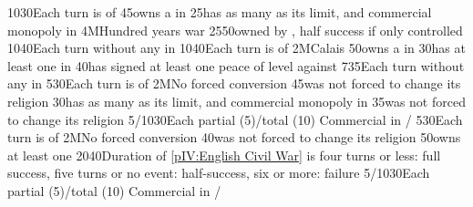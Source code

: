 

 
%
%
{10}{30}{Each turn \paysEcosse is \VASSAL of \ANG}%
%
%
{}{45}{\ANG owns a \Presidio in \provincePicardie}%
%
%
{}{25}{\ANG has as many \MNU\faceplus as its limit, and commercial monopoly in
  }%
%
\EUobjective4M{Hundred years war}{}%
{25}{50}{\provinceGuyenne owned by \paysmajeurAngleterre, half success if only
  controlled}%
%
%
{10}{40}{Each turn without any \REVOLT in \regionIrlande}%
%
%
%
{10}{40}{Each turn \paysEcosse is \VASSAL of \ANG}%
%
\EUobjective2M{Calais}{}%
{}{50}{\ANG owns a \Presidio in \provincePicardie}%
%
%
{}{30}{\ANG has at least one \COL in \continentAmerica}%
%
%
{}{40}{\ANG has signed at least one peace of level  against \FRA}%
%
%
{7}{35}{Each turn without any \REVOLT in \regionIrlande}
%
%
%
{5}{30}{Each turn \paysEcosse is \VASSAL of \ANG}%
%
\EUobjective2M{No forced conversion}{}%
{}{45}{\ANG was not forced to change its religion}%
%
%
{}{30}{\ANG has as many \MNU\faceplus as its limit, and commercial monopoly in
  }%
%
%
%
{}{35}{\HOL was not forced to change its religion}%
%
%
{5/10}{30}{Each partial (5)/total (10) Commercial  in
  \CTZ/\STZ}
%
%
%
{5}{30}{Each turn \paysEcosse is \VASSAL of \ANG}%
%
\EUobjective2M{No forced conversion}{}%
{}{40}{\ANG was not forced to change its religion}%
%
%
{}{50}{\ANG owns at least one }%
%
%
{20}{40}{Duration of \ref{pIV:English Civil War} is four turns or less: full
  success, five turns or no event: half-success, six or more: failure}%
%
%
{5/10}{30}{Each partial (5)/total (10) Commercial  in
  \CTZ/\STZ}
%
%
